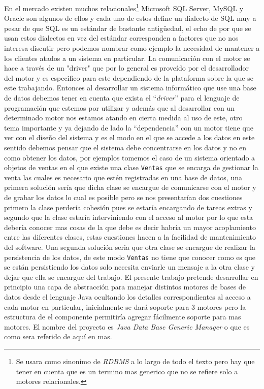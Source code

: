En el mercado existen muchos \dd relacionales\footnote{Se usara \dd como sinonimo de \textit{RDBMS} a lo largo de todo el texto pero hay que tener en cuenta que \dd es un termino mas generico que no se refiere solo a motores relacionales.} Microsoft SQL Server, MySQL y Oracle son algunos de ellos y cada uno de estos define un dialecto de SQL muy a pesar de que SQL es un estándar de bastante antigüedad, el echo de por que se usan estos dialectos en vez del estándar corresponden a factores que no nos interesa discutir pero podemos nombrar como ejemplo la necesidad de mantener a los clientes atados a un sistema en particular. La comunicación con el motor se hace a través de un "driver" que por lo general es proveído por el desarrollador del motor y es especifico para este dependiendo de la plataforma sobre la que se este trabajando. Entonces al desarrollar un sistema informático que use una base de datos debemos tener en cuenta que exista el ``\textit{driver}'' para el lenguaje de programación que estemos por utilizar y además que al desarrollar con un determinado motor nos estamos atando en cierta medida al uso de este, otro tema importante y ya dejando de lado la ``dependencia'' con un motor tiene que ver con el diseño del sistema y es el modo en el que se accede a los datos en este sentido debemos pensar que el sistema debe concentrarse en los datos y no en como obtener los datos, por ejemplos tomemos el caso de un sistema orientado a objetos de ventas en el que existe una clase \verb=Ventas= que se encarga de gestionar la venta las cuales es necesario que estén registradas en una base de datos, una primera solución sería que dicha clase se encargue de comunicarse con el motor y de grabar los datos lo cual es posible pero se nos presentarían dos cuestiones primero la clase perdería cohesión pues se estaría encargando de tareas extras y segundo que la clase estaría interviniendo con el acceso al motor por lo que esta debería conocer mas cosas de la que debe es decir habría un mayor acoplamiento entre las diferentes clases, estas cuestiones hacen a la facilidad de mantenimiento del software. Una segunda solución seria que otra clase se encargue de realizar la persistencia de los datos, de este modo \verb=Ventas= no tiene que conocer como es que se están persistiendo los datos solo necesita enviarle un mensaje a la otra clase y dejar que ella se encargue del trabajo. El presente trabajo pretende desarrollar en principio una capa de abstracción para manejar distintos motores de bases de datos desde el lenguaje Java ocultando los detalles correspondientes al acceso a cada motor en particular, inicialmente se dará soporte para 3 motores pero  la estructura de el componente permitiría agregar fácilmente soporte para mas motores. El nombre del proyecto es \textit{Java Data Base Generic Manager} o \jj que es como sera referido de aquí en mas.


